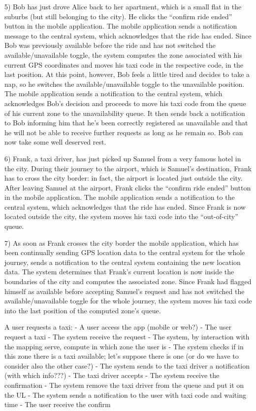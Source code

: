 \documentclass{book}
\begin{document}
5) Bob has just drove Alice back to her apartment, which is a small flat in the suburbs (but still belonging to the city). He clicks the “confirm ride ended” button in the mobile application. The mobile application sends a notification message to the central system, which acknowledges that the ride has ended. 
Since Bob was previously available before the ride and has not switched the available/unavailable toggle, the system computes the zone associated with his current GPS coordinates and moves his taxi code in the respective code, in the last position.
At this point, however, Bob feels a little tired and decides to take a nap, so he switches the available/unavailable toggle to the unavailable position. 
The mobile application sends a notification to the central system, which acknowledges Bob’s decision and proceeds to move his taxi code from the queue of his current zone to the unavailability queue. It then sends back a notification to Bob informing him that he’s been correctly registered as unavailable and that he will not be able to receive further requests as long as he remain so.
Bob can now take some well deserved rest.

6) Frank, a taxi driver, has just picked up Samuel from a very famous hotel in the city. 
During their journey to the airport, which is Samuel’s destination, Frank has to cross the city border: in fact, the airport is located just outside the city.
After leaving Samuel at the airport, Frank clicks the “confirm ride ended” button in the mobile application.
The mobile application sends a notification to the central system, which acknowledges that the ride has ended.
Since Frank is now located outside the city, the system moves his taxi code into the “out-of-city” queue.

7) As soon as Frank crosses the city border the mobile application, which has been continually sending GPS location data to the central system for the whole journey, sends a notification to the central system containing the new location data. 
The system determines that Frank’s current location is now inside the boundaries of the city and computes the associated zone. 
Since Frank had flagged himself as available before accepting Samuel’s request and has not switched the available/unavailable toggle for the whole journey, the system moves his taxi code into the last position of the computed zone’s queue. 



A user requests a taxi:
- A user access the app (mobile or web?)
- The user request a taxi
- The system receive the request
- The system, by interaction with the mapping serve, compute in which zone the user is
- The system checks if in this zone there is a taxi available; let's suppose there is one (or do we have to consider also the other case?)
- The system sends to the taxi driver a notification (with which info???)
- The taxi driver accepts
- The system receive the confirmation
- The system remove the taxi driver from the queue and put it on the UL
- The system sends a notification to the user with taxi code and waiting time
- The user receive the confirm
\end{document}
